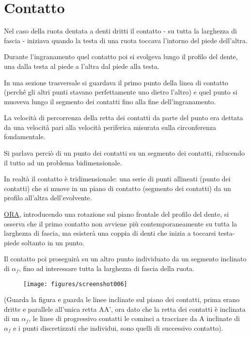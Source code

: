 \documentclass[a4paper, 15pt]{article}
\begin{document}
\section{Contatto}
\begin{adjustwidth}{2in}{}
		Nel caso della ruota dentata a denti dritti il contatto - su tutta la larghezza di fascia - iniziava quando la testa di una ruota toccava l'intorno del piede dell'altra. 
		
		Durante l'ingranamento  quel contatto poi si svolgeva lungo il profilo del dente, una dalla testa al piede a l'altra dal piede alla testa. 
		
		In una sezione trasversale si guardava il primo punto della linea di contatto (perché gli altri punti stavano perfettamente uno dietro l'altro) e quel punto si muoveva lungo il segmento dei contatti fino alla fine dell'ingranamento. 
		
		La velocità di  percorrenza della retta dei contatti da parte del punto era dettata da una velocità  pari alla velocità periferica misurata sulla circonferenza fondamentale. 
		
		Si parlava perciò di un punto dei contatti su un segmento dei contatti, riducendo il tutto ad un problema bidimensionale.  
		
		In realtà il contatto è tridimensionale: una serie di punti allineati (punto dei contatti) che si muove in un piano di contatto (segmento dei contatti) da un profilo all'altra dell'evolvente. \newline 
		
		\underline{ORA}, introducendo una rotazione sul piano frontale del profilo del dente, si osserva che il primo contatto non avviene più contemporaneamente su tutta la larghezza di fascia, ma esisterà una coppia di denti che inizia a toccarsi testa-piede soltanto in un punto.
		
		Il contatto poi proseguirà su un altro punto individuato da un segmento inclinato di $\alpha_f$, fino ad interessare tutta  la larghezza di fascia della ruota. 
		\begin{figure}[H]
			\centering
			\texttt{[image: figures/screenshot006]}
			\caption{}
			\label{fig:screenshot006}
		\end{figure}
		(Guarda la figura e guarda le linee inclinate sul piano dei contatti, prima erano dritte e parallele all'unica retta AA', ora dato che la retta dei contatti è inclinata di un $\alpha_f$, le linee di progressivo contatti le cominci a tracciare da A inclinate di $\alpha_f$ e i punti discretizzati che individui, sono quelli di successivo contatto). \newline
		

\end{adjustwidth}
\end{document}
